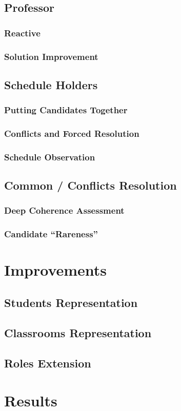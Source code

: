 \documentclass{beamer}
\begin{document}
\subsection{Professor}
\subsubsection{Reactive}
\subsubsection{Solution Improvement}

\subsection{Schedule Holders}
\subsubsection{Putting Candidates Together}
\subsubsection{Conflicts and Forced Resolution}
\subsubsection{Schedule Observation}

\subsection{Common / Conflicts Resolution}
\subsubsection{Deep Coherence Assessment}
\subsubsection{Candidate ``Rareness''}

\section{Improvements}
\subsection{Students Representation}
\subsection{Classrooms Representation}
\subsection{Roles Extension}

\section{Results}
\end{document}
